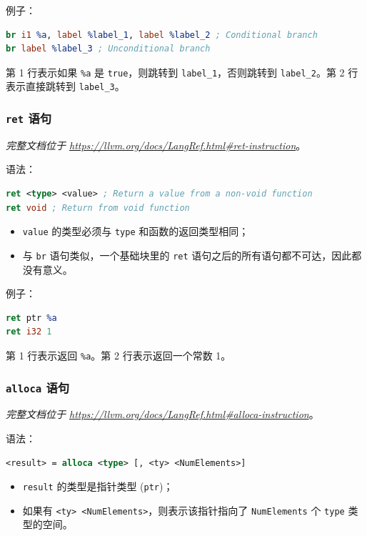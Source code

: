 例子：
\begin{lstlisting}[language=llvm]
br i1 %a, label %label_1, label %label_2 ; Conditional branch
br label %label_3 ; Unconditional branch
\end{lstlisting}

第 1 行表示如果 \texttt{\%a} 是 \texttt{true}，则跳转到
\texttt{label\_1}，否则跳转到 \texttt{label\_2}。第 2 行表示直接跳转到
\texttt{label\_3}。

\subsubsection{\texttt{ret} 语句}\label{LLVM-ret-statements}

\textit{完整文档位于 \url{https://llvm.org/docs/LangRef.html\#ret-instruction}}。

语法：
\begin{lstlisting}[language=llvm]
ret <type> <value> ; Return a value from a non-void function
ret void ; Return from void function
\end{lstlisting}

\begin{itemize}
  \item \texttt{value} 的类型必须与 \texttt{type} 和函数的返回类型相同；
  \item 与 \texttt{br} 语句类似，一个基础块里的 \texttt{ret}
    语句之后的所有语句都不可达，因此都没有意义。
\end{itemize}

例子：
\begin{lstlisting}[language=llvm]
ret ptr %a
ret i32 1
\end{lstlisting}

第 1 行表示返回 \texttt{\%a}。第 2 行表示返回一个常数 1。

\subsubsection{\texttt{alloca} 语句}\label{LLVM-alloca-statements}

\textit{完整文档位于 \url{https://llvm.org/docs/LangRef.html\#alloca-instruction}}。

语法：
\begin{lstlisting}[language=llvm]
<result> = alloca <type> [, <ty> <NumElements>]
\end{lstlisting}

\begin{itemize}
  \item \texttt{result} 的类型是指针类型 (\texttt{ptr})；
  \item 如果有 \texttt{<ty> <NumElements>}，则表示该指针指向了
    \texttt{NumElements} 个 \texttt{type} 类型的空间。
\end{itemize}

